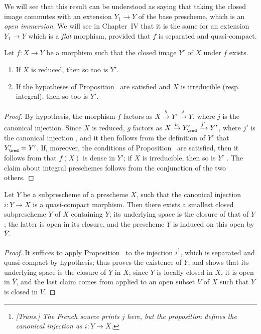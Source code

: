 We will see that this result can be understood as saying that taking the closed image commutes with an extension $Y_1\to Y$ of the base prescheme, which is an \emph{open immersion}.
We will see in Chapter~IV that it is the same for an extension $Y_1\to Y$ which is a \emph{flat} morphism, provided that $f$ is separated and quasi-compact.

\begin{proposition}[9.5.9]
\label{I.9.5.9}
Let $f:X\to Y$ be a morphism such that the closed image $Y'$ of $X$ under $f$ exists.
\begin{enumerate}
  \item[{\rm(i)}] If $X$ is reduced, then so too is $Y'$.
  \item[{\rm(ii)}] If the hypotheses of Proposition~ are satisfied and $X$ is irreducible (resp. integral), then so too is $Y'$.
\end{enumerate}
\end{proposition}

\begin{proof}
By hypothesis, the morphism $f$ factors as $X\xrightarrow{g}Y'\xrightarrow{j}Y$, where $j$ is the canonical injection.
Since $X$ is reduced, $g$ factors as $X\xrightarrow{h}Y'_\red\xrightarrow{j'}Y'$, where $j'$ is the canonical injection , and it then follows from the definition of $Y'$ that $Y'_\red=Y'$.
If, moreover, the conditions of Proposition~ are satisfied, then it follows from  that $f(X)$ is dense in $Y'$; if $X$ is irreducible, then so is $Y'$ .
The claim about integral preschemes follows from the conjunction of the two others.
\end{proof}

\begin{proposition}[9.5.10]
\label{I.9.5.10}
Let $Y$ be a subprescheme of a prescheme $X$, such that the canonical injection $i:Y\to X$ is a quasi-compact morphism.
Then there exists a smallest closed subprescheme $\overline{Y}$ of $X$ containing $Y$; its underlying space is the closure of that of $Y$; the latter is open in its closure, and the prescheme $Y$ is induced on this open by $\overline{Y}$.
\end{proposition}

\begin{proof}
It suffices to apply Proposition~ to the injection $i$\footnote{\emph{[Trans.] The French source prints $j$ here, but the proposition defines the canonical injection as $i:Y\to X$.}}, which is separated  and quasi-compact by hypothesis;  thus proves the existence of $\overline{Y}$, and  shows that its underlying space is the closure of $Y$ in $X$; since $Y$ is locally closed in $X$, it is open in $\overline{Y}$, and the last claim comes from  applied to an open subset $V$ of $X$ such that $Y$ is closed in $V$.
\end{proof}

